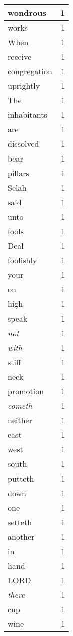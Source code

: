 \begin{center}
\begin{longtable}{l|r}
wondrous & 1 \\ \hline
works & 1 \\ \hline
When & 1 \\ \hline
receive & 1 \\ \hline
congregation & 1 \\ \hline
uprightly & 1 \\ \hline
The & 1 \\ \hline
inhabitants & 1 \\ \hline
are & 1 \\ \hline
dissolved & 1 \\ \hline
bear & 1 \\ \hline
pillars & 1 \\ \hline
Selah & 1 \\ \hline
said & 1 \\ \hline
unto & 1 \\ \hline
fools & 1 \\ \hline
Deal & 1 \\ \hline
foolishly & 1 \\ \hline
your & 1 \\ \hline
on & 1 \\ \hline
high & 1 \\ \hline
speak & 1 \\ \hline
\emph{not} & 1 \\ \hline
\emph{with} & 1 \\ \hline
stiff & 1 \\ \hline
neck & 1 \\ \hline
promotion & 1 \\ \hline
\emph{cometh} & 1 \\ \hline
neither & 1 \\ \hline
east & 1 \\ \hline
west & 1 \\ \hline
south & 1 \\ \hline
putteth & 1 \\ \hline
down & 1 \\ \hline
one & 1 \\ \hline
setteth & 1 \\ \hline
another & 1 \\ \hline
in & 1 \\ \hline
hand & 1 \\ \hline
LORD & 1 \\ \hline
\emph{there} & 1 \\ \hline
cup & 1 \\ \hline
wine & 1 \\ \hline

\end{longtable}
\end{center}
